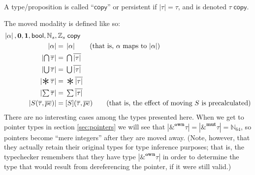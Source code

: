 \documentclass[acmsmall,nonacm]{acmart}
\DeclareMathOperator*{\Sep}{\scalerel*{\ast}{\sum}}
\newcommand*{\N}{\mathbb{N}}
\newcommand*{\Z}{\mathbb{Z}}
\newcommand{\core}[1]{\left| #1 \right|}
\begin{document}
A type/proposition is called ``$\mathsf{copy}$'' or persistent if $\core\tau=\tau$, and is denoted $\tau\;\mathsf{copy}$.

The moved modality is defined like so:
\begin{align*}
  \core\alpha,\mathbf{0}, \mathbf{1}, \mathsf{bool},\N_s, \Z_s&\;\mathsf{copy}\\
  \core\alpha={}&\core\alpha\qquad\mbox{(that is, $\alpha$ maps to $\core\alpha$)}\\
  \core{\textstyle\bigcap\overline{\tau}}={}&\textstyle\bigcap\overline{\core\tau}\\
  \core{\textstyle\bigcup\overline{\tau}}={}&\textstyle\bigcup\overline{\core\tau}\\
  \core{\textstyle\Sep\overline{\tau}}={}&\textstyle\Sep\overline{\core\tau}\\
  \core{\textstyle\sum\overline{\tau}}={}&\textstyle\sum\overline{\core\tau}\\
  \core{S(\overline{\tau},\overline{pe})}={}&[S](\overline{\tau},\overline{pe})\qquad\mbox{(that is, the effect of moving $S$ is precalculated)}
\end{align*}
There are no interesting cases among the types presented here. When we get to pointer types in section \ref{sec:pointers} we will see that $\core{\&^\mathbf{own}\tau}=\core{\&^\mathbf{mut}\tau}=\N_{64}$, so pointers become ``mere integers'' after they are moved away. (Note, however, that they actually retain their original types for type inference purposes; that is, the typechecker remembers that they have type $\core{\&^\mathbf{own}\tau}$ in order to determine the type that would result from dereferencing the pointer, if it were still valid.)
\end{document}
